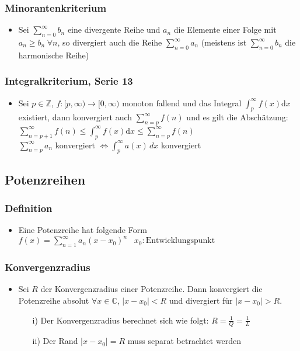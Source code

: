 \documentclass[a3paper, 11pt, landscape]{scrartcl}
\begin{document}
\begin{multicols*}{3}
		\subsubsection{Minorantenkriterium}
		\begin{itemize}
		    \item Sei $\sum_{n=0}^{\infty}b_n$ eine divergente Reihe und $a_n$ die Elemente einer Folge mit $a_n \ge b_n \hspace{3pt} \forall n$, so divergiert auch die Reihe $\sum_{n=0}^{\infty} a_n$ (meistens ist $\sum_{n=0}^{\infty}b_n$ die harmonische Reihe)
		\end{itemize}
		
		\subsubsection{Integralkriterium, Serie 13}
		\begin{itemize}
		    \item Sei $p \in \mathbb{Z}$, $f: [p, \infty) \rightarrow [0, \infty)$ monoton fallend und das Integral $\int_{p}^{\infty}f(x)$d$x$ existiert, dann konvergiert auch $\sum_{n=p}^{\infty}f(n)$ und es gilt die Abschätzung:\\
		    $\sum_{n=p+1}^{\infty}f(n) \le \int_{p}^{\infty}f(x)\text{d}x \le \sum_{n=p}^{\infty}f(n)$\\
		    $\sum_{n=p}^\infty a_n$ konvergiert $\iff \int_p^\infty a(x)\,dx$ konvergiert 
		\end{itemize}
	
	    \subsection{Potenzreihen}
	    \subsubsection{Definition}
	    \begin{itemize}
	        \item Eine Potenzreihe hat folgende Form
				$f(x)=\sum_{n=1}^{\infty}a_n(x-x_0)^n \hspace{10pt} x_0: \text{Entwicklungspunkt}$
	    \end{itemize}
	    \subsubsection{Konvergenzradius}
	    \begin{itemize}
	        \item Sei $R$ der Konvergenzradius einer Potenzreihe. Dann konvergiert die Potenzreihe absolut $\forall x \in \mathbb{C}$, $\vert x-x_0 \vert < R$ und divergiert für $\vert x-x_0 \vert > R$.\\
	        \begin{itemize}{Anmerkungen:}
						\item[i)] Der Konvergenzradius berechnet sich wie folgt: $R=\frac{1}{Q} = \frac{1}{L}$
						\item[ii)] Der Rand $\vert x-x_0 \vert = R$ muss separat betrachtet werden
					\end{itemize}
	    \end{itemize}
	

\end{multicols*}
\end{document}

